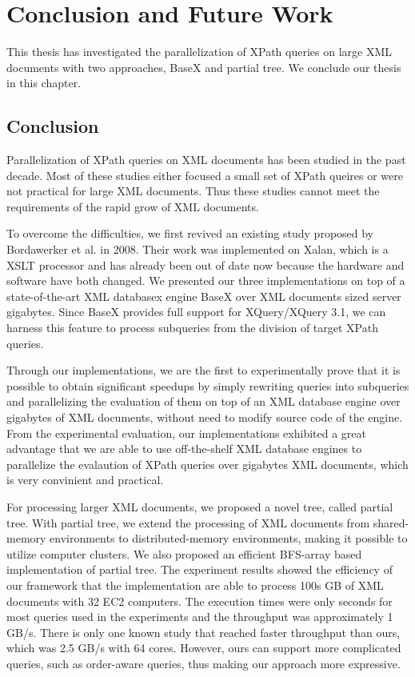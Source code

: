 \chapter{Conclusion and Future Work}

This thesis has investigated the parallelization of XPath queries on large XML
documents with two approaches, BaseX and partial tree. We conclude our thesis in
this chapter.

\section{Conclusion}

Parallelization of XPath queries on XML documents has been studied in the past
decade. Most of these studies either focused a small set of XPath queires or
were not practical for large XML documents. Thus these studies cannot meet the
requirements of the rapid grow of XML documents.

To overcome the difficulties, we first revived an existing study proposed by
Bordawerker et al. in 2008. Their work was implemented on Xalan, which is a XSLT
processor and has already been out of date now because the hardware and software
have both changed. We presented our three implementations on top of a
state-of-the-art XML databasex engine BaseX over XML documents sized server
gigabytes. Since BaseX provides full support for XQuery/XQuery 3.1, we can
harness this feature to process subqueries from the division of target XPath
queries.

Through our implementations, we are the first to experimentally prove that it is
possible to obtain significant speedups by simply rewriting queries into
subqueries and parallelizing the evaluation of them on top of an XML database
engine over gigabytes of XML documents, without need to modify source code of
the engine. From the experimental evaluation, our implementations exhibited a
great advantage that we are able to use off-the-shelf XML database engines to
parallelize the evalaution of XPath queries over gigabytes XML documents, which
is very convinient and practical.

For processing larger XML documents, we proposed a novel tree, called partial
tree. With partial tree, we extend the processing of XML documents from
shared-memory environments to distributed-memory environments, making it
possible to utilize computer clusters. We also proposed an efficient BFS-array
based implementation of partial tree. The experiment results showed the
efficiency of our framework that the implementation are able to process 100s GB
of XML documents with 32 EC2 computers. The execution times were only seconds
for most queries used in the experiments and the throughput was approximately 1
GB/s. There is only one known study that reached faster throughput than ours,
which was 2.5 GB/s with 64 cores. However, ours can support more complicated
queries, such as order-aware queries, thus making our approach more expressive.

